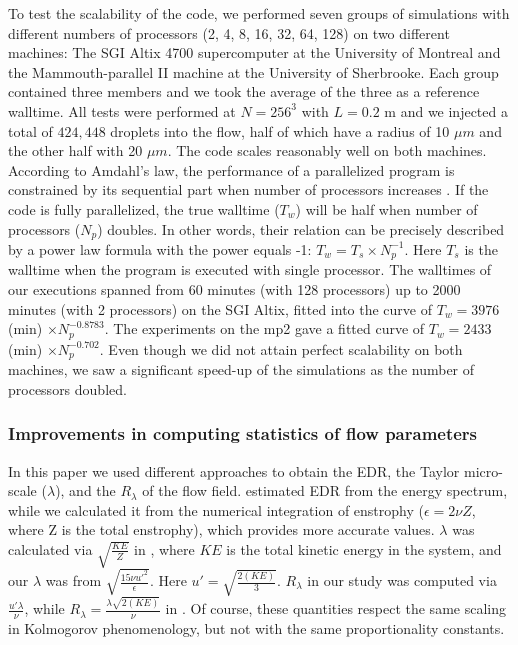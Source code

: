 To test the scalability of the code, we performed seven groups of simulations with different numbers of processors (2, 4, 8, 16, 32, 64, 128) on two different machines: The SGI Altix 4700 supercomputer at the University of Montreal and the Mammouth-parallel II machine at the University of Sherbrooke. Each group contained three members and we took the average of the three as a reference walltime. All tests were performed at $N = 256^3$ with $L=0.2$ m and we injected a total of $424,448$ droplets into the flow, half of which have a radius of 10 $\mu m$ and the other half with 20 $\mu m$. The code scales reasonably well on both machines. According to Amdahl's law, the performance of a parallelized program is constrained by its sequential part when number of processors increases \citep{Amdahl1967}. If the code is fully parallelized, the true walltime ($T_w$) will be half when number of processors ($N_p$) doubles. In other words, their relation can be precisely described by a power law formula with the power equals -1: $T_w=T_s\times N_p^{-1}$. Here $T_s$ is the walltime when the program is executed with single processor. The walltimes of our executions spanned from 60 minutes (with 128 processors) up to 2000 minutes (with 2 processors) on the SGI Altix, fitted into the curve of $T_w=3976$ (min) $\times N_p^{-0.8783}$. The experiments on the mp2 gave a fitted curve of $T_w=2433$ (min) $\times N_p^{-0.702}$. Even though we did not attain perfect scalability on both machines, we saw a significant speed-up of the simulations as the number of processors doubled. 

\subsubsection{Improvements in computing statistics of flow parameters} \label{sec:ch2_flowpara}

In this paper we used different approaches to obtain the EDR, the Taylor micro-scale ($\lambda$), and the $R_\lambda$ of the flow field. \citet{Franklin2005} estimated EDR from the energy spectrum, while we calculated it from the numerical integration of enstrophy ($\epsilon = 2\nu Z$, where Z is the total enstrophy), which provides more accurate values. $\lambda$ was calculated via $\sqrt{\frac{KE}{Z}}$ in \citet{Franklin2005}, where $KE$ is the total kinetic energy in the system, and our $\lambda$ was from $\sqrt{\frac{15\nu u\prime^2}{\epsilon}}$. Here $u\prime=\sqrt{\frac{2(KE)}{3}}$. $R_\lambda$ in our study was computed via $\frac{u\prime\lambda }{\nu}$, while $R_\lambda = \frac{\lambda\sqrt{2(KE)} }{\nu}$ in \citet{Franklin2005}.  Of course, these quantities respect the same scaling in Kolmogorov phenomenology, but not with the same proportionality constants. 

